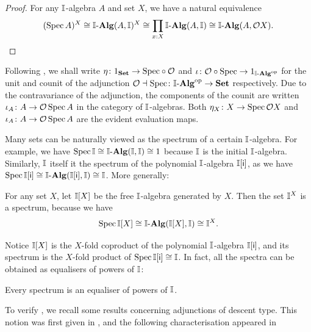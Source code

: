 \begin{proof}
  For any $\mathbb{I}$-algebra $A$ and set $X$, we have a natural equivalence 
  \[ (\spec A)^X \cong \I\alg(A,\I)^X \cong \prod_{x:X}\I\alg(A,\I)\cong \I\alg(A,\opens{X})\text{.} \qedhere\]
\end{proof}

\begin{convention}
  Following \citet{Taylor2011}, we shall write $\eta\colon 1_{\mathbf{Set}}\to {\operatorname{Spec}}\circ \mathcal{O}$ and $\iota\colon \opens\circ\spec\to 1_{\I\alg\op}$ for the unit and counit of the adjunction $\opens\dashv \spec\colon \I\alg\op\to \Set$ respectively. Due to the contravariance of the adjunction, the components of the counit are written $\iota_A\colon A\to \mathcal{O}\operatorname{Spec}{A}$ in the category of $\mathbb{I}$-algebras. Both $\eta_X\colon X\to \operatorname{Spec}\mathcal{O}{X}$ and $\iota_A\colon A\to \mathcal{O}\operatorname{Spec}{A}$ are the evident evaluation maps.
\end{convention}

Many sets can be naturally viewed as the spectrum of a certain $\mathbb{I}$-algebra. For example, we have $\spec \I \cong \I\alg(\I,\I) \cong 1$ because  $\mathbb{I}$ is the initial $\mathbb{I}$-algebra. Similarly, $\mathbb{I}$ itself it the spectrum of the polynomial $\mathbb{I}$-algebra $\mathbb{I}[\mathsf{i}]$, as we have $\spec \I[\ms{i}] \cong \I\alg(\I[\ms{i}],\I) \cong \I$. More generally:

\begin{example}[Cubes]\label{exm:cubesober}
  For any set $X$, let $\mathbb{I}[X]$ be the free $\mathbb{I}$-algebra generated by $X$. Then the set $\mathbb{I}^X$ is a spectrum, because we have
  \[ \spec \I[X] \cong \I\alg(\I[X],\I) \cong \I^X\text{.} \]
\end{example}

Notice $\mathbb{I}[X]$ is the $X$-fold coproduct of the polynomial $\mathbb{I}$-algebra $\mathbb{I}[\mathsf{i}]$, and its spectrum is the $X$-fold product of $\operatorname{Spec}\mathbb{I}[\mathsf{i}] \cong \mathbb{I}$. In fact, all the spectra can be obtained as equalisers of powers of $\mathbb{I}$:

\begin{proposition}\label{prop:spectra-are-powers-of-the-interval}
  Every spectrum is an equaliser of powers of $\mathbb{I}$. 
\end{proposition}

To verify , we recall some results concerning adjunctions of descent type. This notion was first given in \citet{BarrMichael1985Ttat}, and the following characterisation appeared in \citet{kelly1993adjunctions}


